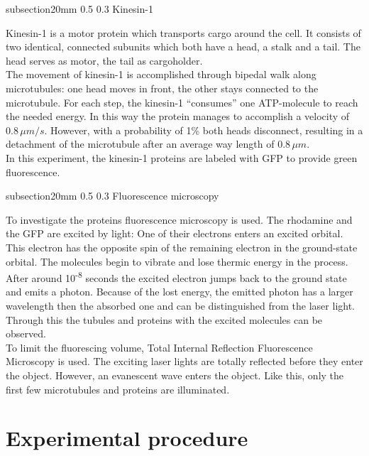 \documentclass[english, %
parskip=full, %
bibliography=totoc, %
draft, %
]{scrartcl}
\makeatletter
\renewcommand\subsection{\@startsection 
   {subsection}{2}{0mm}%
   {0.5\baselineskip}%
   {0.3\baselineskip}%
   {\bfseries\sffamily\large}%
   }
\makeatother
\begin{document}
\subsection{Kinesin-1}

Kinesin-1 is a motor protein which transports cargo around the cell. It consists of two identical, connected subunits which both have a head, a stalk and a tail. The head serves as motor, the tail as cargoholder. \\
The movement of kinesin-1 is accomplished through bipedal walk along microtubules: one head moves in front, the other stays connected to the microtubule. For each step, the kinesin-1 “consumes” one ATP-molecule to reach the needed energy. In this way the protein manages to accomplish a velocity of 0.8\,$\mu m/s$. However, with a probability of 1\% both heads disconnect, resulting in a detachment of the microtubule after an average way length of 0.8\,$\mu m$.\\
In this experiment, the kinesin-1 proteins are labeled with GFP to provide green fluorescence.

\subsection{Fluorescence microscopy}

To investigate the proteins fluorescence microscopy is used. The rhodamine and the GFP are excited by light: One of their electrons enters an excited orbital. This electron has the opposite spin of the remaining electron in the ground-state orbital. The molecules begin to vibrate and lose thermic energy in the process. After around 10\textsuperscript{-8} seconds the excited electron jumps back to the ground state and emits a photon. Because of the lost energy, the emitted photon has a larger wavelength then the absorbed one and can be distinguished from the laser light. Through this the tubules and proteins with the excited molecules can be observed.\\
To limit the fluorescing volume, Total Internal Reflection Fluorescence Microscopy is used. The exciting laser lights are totally reflected before they enter the object. However, an evanescent wave enters the object. Like this, only the first few microtubules and proteins are illuminated.


\section{Experimental procedure}
\end{document}
